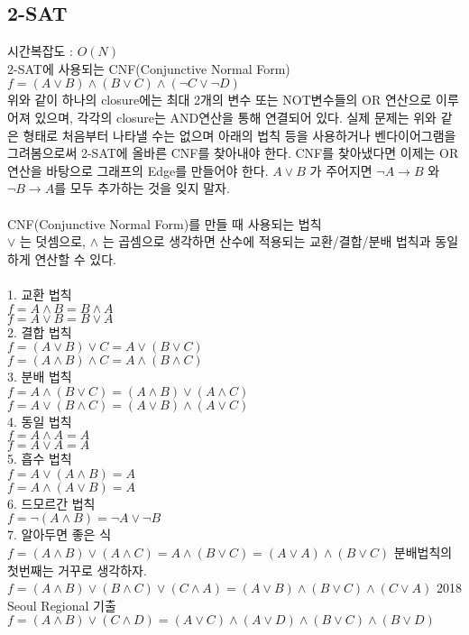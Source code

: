 \documentclass[10pt,landscape,a4paper,twocolumn]{article}
\begin{document}
\subsection{2-SAT}
시간복잡도 : $O(N)$\\
2-SAT에 사용되는 CNF(Conjunctive Normal Form)\\
$f=(A \lor B)\land(B \lor C)\land(\lnot C \lor \lnot D)$\\
위와 같이 하나의 closure에는 최대 2개의 변수 또는 NOT변수들의 OR 연산으로 이루어져 있으며, 각각의 closure는 AND연산을 통해 연결되어 있다. 실제 문제는 위와 같은 형태로 처음부터 나타낼 수는 없으며 아래의 법칙 등을 사용하거나 벤다이어그램을 그려봄으로써 2-SAT에 올바른 CNF를 찾아내야 한다. CNF를 찾아냈다면 이제는 OR 연산을 바탕으로 그래프의 Edge를 만들어야 한다. $A \lor B$ 가 주어지면 $\lnot A \rightarrow B$ 와 $\lnot B \rightarrow A$를 모두 추가하는 것을 잊지 말자.\\
\\
CNF(Conjunctive Normal Form)를 만들 때 사용되는 법칙\\
$\lor$ 는 덧셈으로, $\land$ 는 곱셈으로 생각하면 산수에 적용되는 교환/결합/분배 법칙과 동일하게 연산할 수 있다.\\\\
1. 교환 법칙\\
$f=A \land B = B \land A$\\
$f=A \lor B = B \lor A$\\
2. 결합 법칙\\
$f=(A \lor B)\lor C = A \lor (B \lor C)$\\
$f=(A \land B)\land C = A \land (B \land C)$\\
3. 분배 법칙\\
$f=A \land (B \lor C) = (A \land B) \lor (A \land C)$\\
$f=A \lor (B \land C) = (A \lor B) \land (A \lor C)$\\
4. 동일 법칙\\
$f=A \land A = A$\\
$f=A \lor A = A$\\
5. 흡수 법칙\\
$f=A \lor (A \land B) = A$\\
$f=A \land (A \lor B) = A$\\
6. 드모르간 법칙\\
$f=\lnot (A \land B) = \lnot A \lor \lnot B$\\
7. 알아두면 좋은 식\\
$f=(A \land B) \lor (A \land C) = A \land (B \lor C) = (A \lor A) \land (B \lor C)$ \hspace{1em} 분배법칙의 첫번째는 거꾸로 생각하자.\\
$f=(A \land B) \lor (B \land C) \lor (C \land A) = (A \lor B) \land (B \lor C) \land (C \lor A)$ \hspace{1em} 2018 Seoul Regional 기출\\
$f=(A \land B) \lor (C \land D) = (A \lor C) \land (A \lor D) \land (B \lor C) \land (B \lor D)$\\

\end{document}
